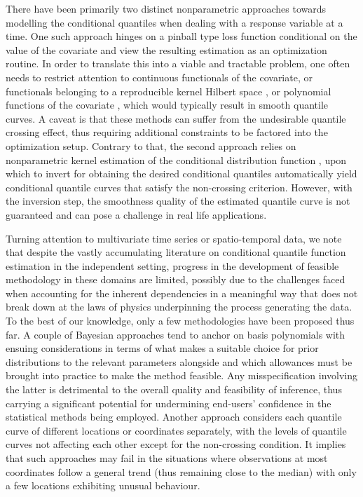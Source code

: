\documentclass[aos]{imsart}
\theoremstyle{plain}
\theoremstyle{remark}
\begin{document}
There have been primarily two distinct nonparametric approaches towards modelling the conditional quantiles when dealing with a response variable at a time. One such approach hinges on a pinball type loss function conditional on the value of the covariate and view the resulting estimation as an optimization routine. In order to translate this into a viable and tractable problem, one often needs to restrict attention to continuous functionals of the covariate, or functionals belonging to a reproducible kernel Hilbert space \citep{takeuchi2006nonparametric}, or polynomial functions of the covariate \citep{zhou2009local}, which would typically result in smooth quantile curves. A caveat is that these methods can suffer from the undesirable quantile crossing effect, thus requiring additional constraints to be factored into the optimization setup. Contrary to that, the second approach relies on nonparametric kernel estimation of the conditional distribution function \citep[cf.][and references therein]{ferraty2005conditional,ezzahrioui2008asymptotic2}, upon which to invert for obtaining the desired conditional quantiles automatically yield conditional quantile curves that satisfy the non-crossing criterion. However, with the inversion step, the smoothness quality of the estimated quantile curve is not guaranteed and can pose a challenge in real life applications.

Turning attention to multivariate time series or spatio-temporal data, we note that despite the vastly accumulating literature on conditional quantile function estimation in the independent setting, progress in the development of feasible methodology in these domains are limited, possibly due to the challenges faced when accounting for the inherent dependencies in a meaningful way that does not break down at the laws of physics underpinning the process generating the data. To the best of our knowledge, only a few methodologies have been proposed thus far. A couple of Bayesian approaches \citep[e.g.][]{reich2011bayesian,das2017analyzing} tend to anchor on basis polynomials with ensuing considerations in terms of what makes a suitable choice for prior distributions to the relevant parameters alongside and which allowances must be brought into practice to make the method feasible. Any misspecification involving the latter is detrimental to the overall quality and feasibility of inference, thus carrying a significant potential for undermining end-users' confidence in the statistical methods being employed. Another approach \citep[e.g.][]{reich2012spatiotemporal,duan2021spatio} considers each quantile curve of different locations or coordinates separately, with the levels of quantile curves not affecting each other except for the non-crossing condition. It implies that such approaches may fail in the situations where observations at most coordinates follow a general trend (thus remaining close to the median) with only a few locations exhibiting unusual behaviour. 
\end{document}
